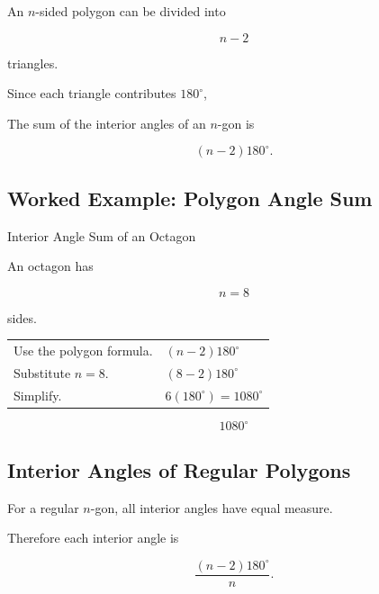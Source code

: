 An \(n\)-sided polygon can be divided into

\[ n-2 \]

triangles.

Since each triangle contributes \(180^\circ\),

\begin{theorem}
The sum of the interior angles of an \(n\)-gon is

\[ \boxed{(n-2)180^\circ.} \]
\end{theorem}

\subsection{Worked Example: Polygon Angle Sum}
\label{subsec:worked-polygon-angle-sum}

\begin{workedexamplebox}{Interior Angle Sum of an Octagon}

An octagon has

\[ n=8 \]

sides.

\begin{tabularx}{\textwidth}{@{}>{\raggedright\arraybackslash}p{}X@{}}
Use the polygon formula. & \((n-2)180^\circ\)\\
Substitute \(n=8\). & \((8-2)180^\circ\)\\
Simplify. & \(6(180^\circ)=1080^\circ\)
\end{tabularx}

\begin{answerbox}
\[ \boxed{1080^\circ} \]
\end{answerbox}
\end{workedexamplebox}

\subsection{Interior Angles of Regular Polygons}
\label{subsec:regular-polygon-interior-angle}

For a regular \(n\)-gon, all interior angles have equal measure.

Therefore each interior angle is

\[ \boxed{\frac{(n-2)180^\circ}{n}.} \]

